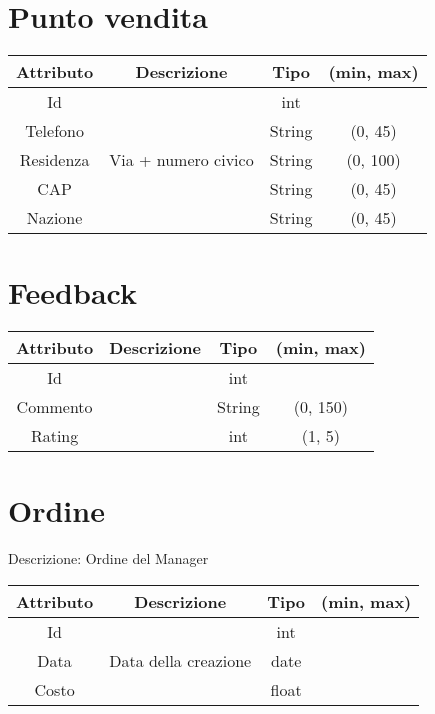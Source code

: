 \section{Punto vendita}
\begin{center}
    \begin{tabular}{||c c c c||}
        \hline
        Attributo & Descrizione & Tipo & (min, max) \\ [0.5ex]
        \hline \hline
        Id &  & int &  \\
        Telefono &  & String & (0, 45) \\
        Residenza & Via + numero civico & String & (0, 100) \\
        CAP &  & String & (0, 45) \\
        Nazione &  & String & (0, 45) \\
        \hline
    \end{tabular}
\end{center}


\section{Feedback}
\begin{center}
    \begin{tabular}{||c c c c||}
        \hline
        Attributo & Descrizione & Tipo & (min, max) \\ [0.5ex]
        \hline \hline
        Id &  & int &  \\
        Commento &  & String & (0, 150) \\
        Rating &  & int & (1, 5) \\
        \hline
    \end{tabular}
\end{center}


\section{Ordine}
Descrizione: Ordine del Manager
\begin{center}
    \begin{tabular}{||c c c c||}
        \hline
        Attributo & Descrizione & Tipo & (min, max) \\ [0.5ex]
        \hline \hline
        Id &  & int &  \\
        Data & Data della creazione & date &  \\
        Costo &  & float &  \\
        \hline
    \end{tabular}
\end{center}


